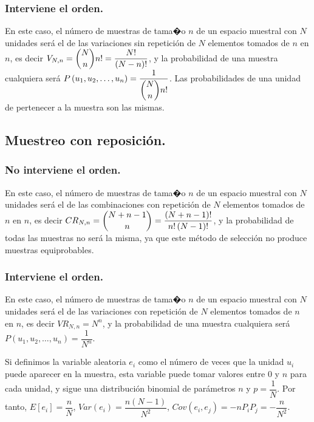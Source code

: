 \subsubsection{Interviene el orden.}

En este caso, el n\'umero de muestras de tama�o $n$ de un espacio muestral
con $N$ unidades ser\'a el de las variaciones sin repetici\'on de $N$
elementos tomados de $n$ en $n$, es decir $V_{N,n}=\dbinom{N}{n}n!=\dfrac{N!}{\left(N-n\right)!}$,
y la probabilidad de una muestra cualquiera ser\'a $P\left(u_{1},u_{2},\ldots,u_{n}\right)=\dfrac{1}{\dbinom{N}{n}n!}$.
Las probabilidades de una unidad de pertenecer a la muestra son las
mismas.


\subsection{Muestreo con reposici\'on.}


\subsubsection{No interviene el orden.}

En este caso, el n\'umero de muestras de tama�o $n$ de un espacio muestral
con $N$ unidades ser\'a el de las combinaciones con repetici\'on de $N$
elementos tomados de $n$ en $n$, es decir $CR_{N,n}=\dbinom{N+n-1}{n}=\dfrac{\left(N+n-1\right)!}{n!\left(N-1\right)!}$,
y la probabilidad de todas las muestras no ser\'a la misma, ya que este
m\'etodo de selecci\'on no produce muestras equiprobables.


\subsubsection{Interviene el orden.}

En este caso, el n\'umero de muestras de tama�o $n$ de un espacio muestral
con $N$ unidades ser\'a el de las variaciones con repetici\'on de $N$
elementos tomados de $n$ en $n$, es decir $VR_{N,n}=N^{n}$, y la
probabilidad de una muestra cualquiera ser\'a $P\left(u_{1},u_{2},\ldots,u_{n}\right)=\dfrac{1}{N^{n}}$.

Si definimos la variable aleatoria $e_{i}$ como el n\'umero de veces
que la unidad $u_{i}$ puede aparecer en la muestra, esta variable
puede tomar valores entre $0$ y $n$ para cada unidad, y sigue una
distribuci\'on binomial de par\'ametros $n$ y $p=\dfrac{1}{N}$. Por
tanto, $E\left[e_{i}\right]=\dfrac{n}{N}$, $Var\left(e_{i}\right)=\dfrac{n\left(N-1\right)}{N^{2}}$,
$Cov\left(e_{i},e_{j}\right)=-nP_{i}P_{j}=-\dfrac{n}{N^{2}}$.


